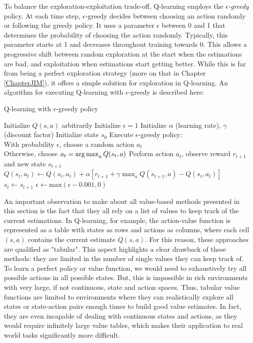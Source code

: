 To balance the exploration-exploitation trade-off, Q-learning employs the $\epsilon$\textit{-greedy} policy. At each time step, $\epsilon$-greedy decides between choosing an action randomly or following the greedy policy. It uses a parameter $\epsilon$ between 0 and 1 that determines the probability of choosing the action randomly. Typically, this parameter starts at 1 and decreases throughout training towards 0. This allows a progressive shift between random exploration at the start when the estimations are bad, and exploitation when estimations start getting better. While this is far from being a perfect exploration strategy (more on that in Chapter \ref{ChapterJIM}), it offers a simple solution for exploration in Q-learning. An algorithm for executing Q-learning with $\epsilon$-greedy is described here: 
\begin{algorithm}
\caption{Q-learning with $\epsilon$-greedy policy}
\label{alg:q_learning}
\begin{algorithmic}
\State Initialize $Q(s, a)$ arbitrarily
\State Initialize $\epsilon=1$
\State Initialize $\alpha$ (learning rate), $\gamma$ (discount factor)
    \State Initialize state $s_0$
        \State Execute $\epsilon$-greedy policy:\\
        \hspace{45pt} With probability $\epsilon$, choose a random action $a_t$\\
        \hspace{45pt} Otherwise, choose $a_t = \operatorname*{arg\,max}_a Q(s_t, a)$
        \State Perform action $a_t$, observe reward $r_{t+1}$ and new state $s_{t+1}$
        \State $Q(s_t, a_t) \gets Q(s_t, a_t) + \alpha \left[r_{t+1}+\gamma\max_{a}Q(s_{t+1},a)-Q(s_t,a_t) \right]$
        \State $s_t\gets s_{t+1}$
        \State $\epsilon\gets\text{max}(\epsilon-0.001,0)$
    \EndFor
\EndFor
\end{algorithmic}
\end{algorithm}

An important observation to make about all value-based methods presented in this section is the fact that they all rely on a list of values to keep track of the current estimations. In Q-learning, for example, the action-value function is represented as a table with states as rows and actions as columns, where each cell $(s,a)$ contains the current estimate $Q(s,a)$. For this reason, these approaches are qualified as "tabular". This aspect highlights a clear drawback of these methods: they are limited in the number of single values they can keep track of. To learn a perfect policy or value function, we would need to exhaustively try all possible actions in all possible states. But, this is impossible in rich environments with very large, if not continuous, state and action spaces. Thus, tabular value functions are limited to environments where they can realistically explore all states or state-action pairs enough times to build good value estimates. In fact, they are even incapable of dealing with continuous states and actions, as they would require infinitely large value tables, which makes their application to real world tasks significantly more difficult.

